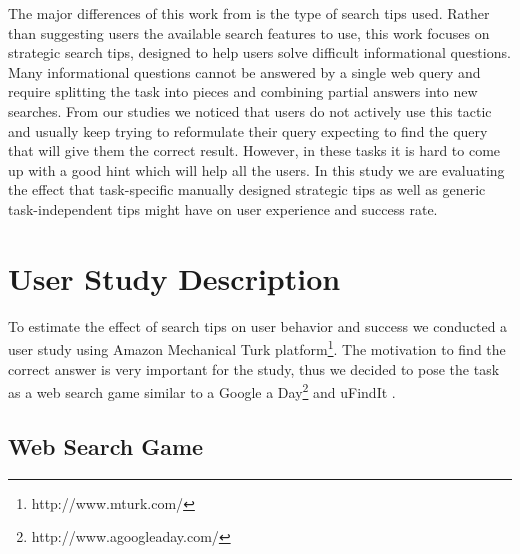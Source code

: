 \documentclass{sig-alternate}
\begin{document}
The major differences of this work from \cite{Moraveji:2011:MIU:2009916.2009966} is the type of search tips used.
Rather than suggesting users the available search features to use, this work focuses on strategic search tips, designed to help users solve difficult informational questions.
Many informational questions cannot be answered by a single web query and require splitting the task into pieces and combining partial answers into new searches. From our studies we noticed that users do not actively use this tactic and usually keep trying to reformulate their query expecting to find the query that will give them the correct result.
However, in these tasks it is hard to come up with a good hint which will help all the users.
In this study we are evaluating the effect that task-specific manually designed strategic tips as well as generic task-independent tips might have on user experience and success rate.



\section{User Study Description}
To estimate the effect of search tips on user behavior and success we conducted a user study using Amazon Mechanical Turk platform\footnote{http://www.mturk.com/}. 
The motivation to find the correct answer is very important for the study, thus we decided to pose the task as a web search game similar to a Google a Day\footnote{http://www.agoogleaday.com/} and uFindIt \cite{Ageev:2011:FYG:2009916.2009965}. 

\subsection{Web Search Game}
\end{document}
